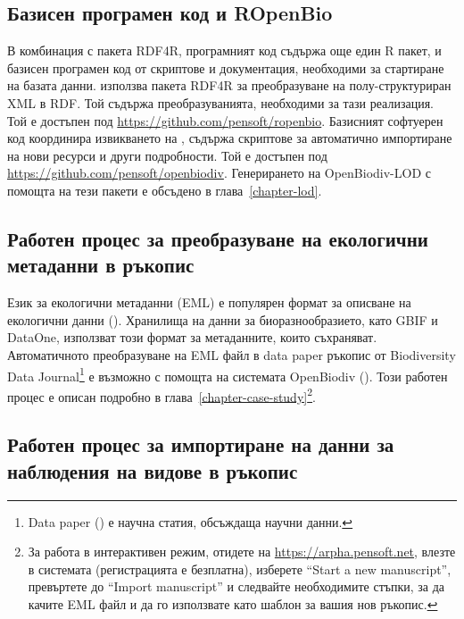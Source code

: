 \subsection{Базисен програмен код и ROpenBio}

В комбинация с пакета RDF4R, програмният код съдържа още един R пакет,  и базисен програмен код от скриптове и документация, необходими за стартиране на базата данни.  използва пакета RDF4R за преобразуване на полу-структуриран XML в RDF. Той съдържа преобразуванията, необходими за тази реализация. Той е достъпен под \url{https://github.com/pensoft/ropenbio}. Базисният софтуерен код координира извикването на , съдържа скриптове за автоматично импортиране на нови ресурси и други подробности. Той е достъпен под \url{https://github.com/pensoft/openbiodiv}. Генерирането на OpenBiodiv-LOD с помощта на тези пакети е обсъдено в глава~\ref{chapter-lod}.

\subsection{Работен процес за преобразуване на екологични метаданни в ръкопис}

Език за екологични метаданни (EML) е популярен формат за описване на екологични данни (\cite{michener_nongeospatial_1997}). Хранилища на данни за биоразнообразието, като GBIF и DataOne, използват този формат за метаданните, които съхраняват. Автоматичното преобразуване на EML файл в data paper ръкопис от Biodiversity Data Journal\footnote {Data paper (\cite{chavan_data_2011}) е научна статия, обсъждаща научни данни.} е възможно с помощта на системата OpenBiodiv (\cite{senderov_online_2016}). Този работен процес е описан подробно в глава~\ref{chapter-case-study}\footnote{За работа в интерактивен режим, отидете на \url{https://arpha.pensoft.net}, влезте в системата (регистрацията е безплатна), изберете ``Start a new manuscript'', превъртете до ``Import manuscript'' и следвайте необходимите стъпки, за да качите EML файл и да го използвате като шаблон за вашия нов ръкопис.}.

\subsection{Работен процес за импортиране на данни за наблюдения на видове в ръкопис}

